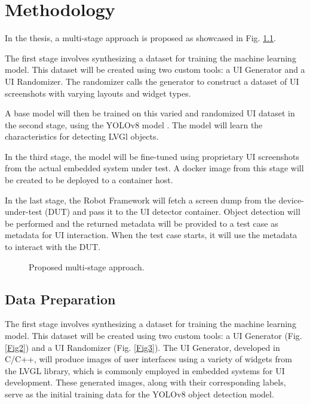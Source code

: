 \documentclass[Proposal,BIC,english,IEEE]{BASE/twbook} %
\begin{document}
\chapter{Methodology}
In the thesis, a multi-stage approach is proposed as showcased in Fig. \ref{Fig1}.

The first stage involves synthesizing a dataset for training the machine learning model. This dataset will be created using two custom tools: a UI Generator and a UI Randomizer. The randomizer calls the generator to construct a dataset of UI screenshots with varying layouts and widget types.

A base model will then be trained on this varied and randomized UI dataset in the second stage, using the YOLOv8 model \autocite{Jocher_Ultralytics_YOLO_2023}. The model will learn the characteristics for detecting LVGl objects.

In the third stage, the model will be fine-tuned using proprietary UI screenshots from the actual embedded system under test. A docker image from this stage will be created to be deployed to a container host.

In the last stage, the Robot Framework \autocite{RobotFramework} will fetch a screen dump from the device-under-test (DUT) and pass it to the UI detector container. Object detection will be performed and the returned metadata will be provided to a test case as metadata for UI interaction. When the test case starts, it will use the metadata to interact with the DUT.
\begin{figure}[!htbp]
    \centering
    
    \caption{Proposed multi-stage approach.}\label{Fig1}
\end{figure}
\newpage
\section{Data Preparation}
The first stage involves synthesizing a dataset for training the machine learning model. This dataset will be created using two custom tools: a UI Generator (Fig. \ref{Fig2}) and a UI Randomizer (Fig. \ref{Fig3}). The UI Generator, developed in C/C++, will produce images of user interfaces using a variety of widgets from the LVGL library, which is commonly employed in embedded systems for UI development. These generated images, along with their corresponding labels, serve as the initial training data for the YOLOv8 object detection model.
\end{document}
